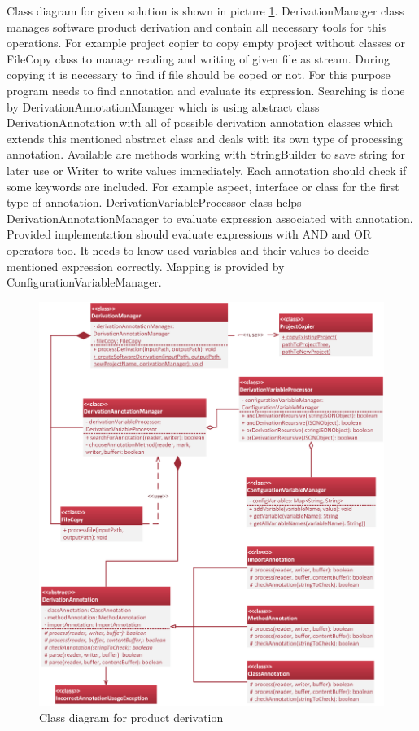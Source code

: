 \documentclass[11pt,english,a4paper,twoside]{article}
\begin{document}
Class diagram for given solution is shown in picture \ref{derivationProductClassDiagram}. DerivationManager class manages software product derivation and contain all necessary tools for this operations. For example project copier to copy empty project without classes or FileCopy class to manage reading and writing of given file as stream. During copying it is necessary to find if file should be coped or not. For this purpose program needs to find annotation and evaluate its expression. Searching is done by DerivationAnnotationManager which is using abstract class DerivationAnnotation with all of possible derivation annotation classes which extends this mentioned abstract class and deals with its own type of processing annotation. Available are methods working with StringBuilder to save string for later use or Writer to write values immediately. Each annotation should check if some keywords are included. For example aspect, interface or class for the first type of annotation. DerivationVariableProcessor class helps DerivationAnnotationManager to evaluate expression associated with annotation. Provided implementation should evaluate expressions with AND and OR operators too. It needs to know used variables and their values to decide mentioned expression correctly. Mapping is provided by ConfigurationVariableManager.

\begin{figure}[H]  %
					\begin{center}
									\includegraphics[width=\linewidth]{fig/DerivationClassTight.png}
									\caption{Class diagram for product derivation}
									\label{derivationProductClassDiagram}
					\end{center}
\end{figure}
\end{document}
